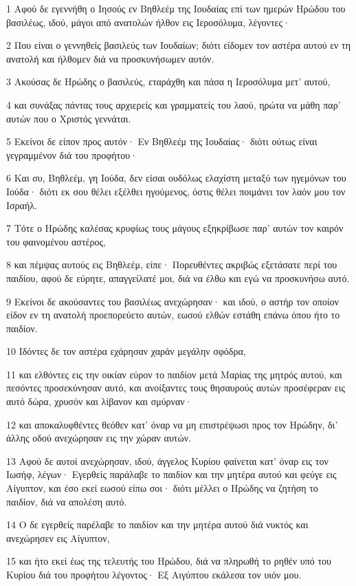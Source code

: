 \par 1 Αφού δε εγεννήθη ο Ιησούς εν Βηθλεέμ της Ιουδαίας επί των ημερών Ηρώδου του βασιλέως, ιδού, μάγοι από ανατολών ήλθον εις Ιεροσόλυμα, λέγοντες·
\par 2 Που είναι ο γεννηθείς βασιλεύς των Ιουδαίων; διότι είδομεν τον αστέρα αυτού εν τη ανατολή και ήλθομεν διά να προσκυνήσωμεν αυτόν.
\par 3 Ακούσας δε Ηρώδης ο βασιλεύς, εταράχθη και πάσα η Ιεροσόλυμα μετ' αυτού,
\par 4 και συνάξας πάντας τους αρχιερείς και γραμματείς του λαού, ηρώτα να μάθη παρ' αυτών που ο Χριστός γεννάται.
\par 5 Εκείνοι δε είπον προς αυτόν· Εν Βηθλεέμ της Ιουδαίας· διότι ούτως είναι γεγραμμένον διά του προφήτου·
\par 6 Και συ, Βηθλεέμ, γη Ιούδα, δεν είσαι ουδόλως ελαχίστη μεταξύ των ηγεμόνων του Ιούδα· διότι εκ σου θέλει εξέλθει ηγούμενος, όστις θέλει ποιμάνει τον λαόν μου τον Ισραήλ.
\par 7 Τότε ο Ηρώδης καλέσας κρυφίως τους μάγους εξηκρίβωσε παρ' αυτών τον καιρόν του φαινομένου αστέρος,
\par 8 και πέμψας αυτούς εις Βηθλεέμ, είπε· Πορευθέντες ακριβώς εξετάσατε περί του παιδίου, αφού δε εύρητε, απαγγείλατέ μοι, διά να έλθω και εγώ να προσκυνήσω αυτό.
\par 9 Εκείνοι δε ακούσαντες του βασιλέως ανεχώρησαν· και ιδού, ο αστήρ τον οποίον είδον εν τη ανατολή προεπορεύετο αυτών, εωσού ελθών εστάθη επάνω όπου ήτο το παιδίον.
\par 10 Ιδόντες δε τον αστέρα εχάρησαν χαράν μεγάλην σφόδρα,
\par 11 και ελθόντες εις την οικίαν εύρον το παιδίον μετά Μαρίας της μητρός αυτού, και πεσόντες προσεκύνησαν αυτό, και ανοίξαντες τους θησαυρούς αυτών προσέφεραν εις αυτό δώρα, χρυσόν και λίβανον και σμύρναν·
\par 12 και αποκαλυφθέντες θεόθεν κατ' όναρ να μη επιστρέψωσι προς τον Ηρώδην, δι' άλλης οδού ανεχώρησαν εις την χώραν αυτών.
\par 13 Αφού δε αυτοί ανεχώρησαν, ιδού, άγγελος Κυρίου φαίνεται κατ' όναρ εις τον Ιωσήφ, λέγων· Εγερθείς παράλαβε το παιδίον και την μητέρα αυτού και φεύγε εις Αίγυπτον, και έσο εκεί εωσού είπω σοι· διότι μέλλει ο Ηρώδης να ζητήση το παιδίον, διά να απολέση αυτό.
\par 14 Ο δε εγερθείς παρέλαβε το παιδίον και την μητέρα αυτού διά νυκτός και ανεχώρησεν εις Αίγυπτον,
\par 15 και ήτο εκεί έως της τελευτής του Ηρώδου, διά να πληρωθή το ρηθέν υπό του Κυρίου διά του προφήτου λέγοντος· Εξ Αιγύπτου εκάλεσα τον υιόν μου.
